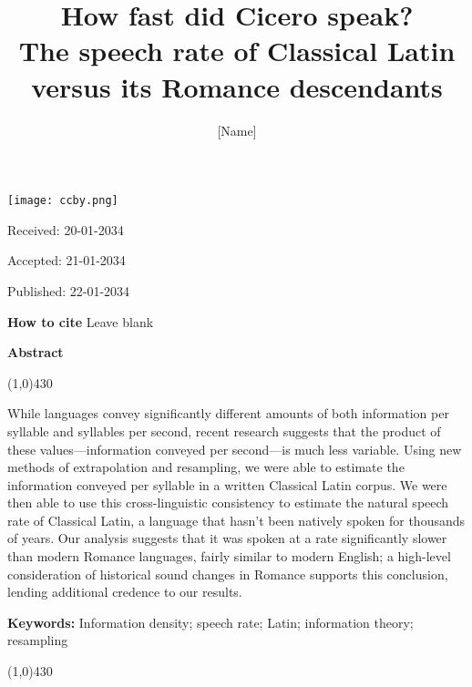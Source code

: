 \documentclass[12pt,twoside]{article}
\title{{\Huge{}How fast did Cicero speak?}\\{\Large{}The speech rate of Classical Latin versus its Romance descendants}}
\author{[Name]}
\affil{[Affiliation]\\[Email]}
\date{}
\makeatletter
\def\maketitle{{%
		\renewenvironment{tabular}[2][]
		{\begin{flushleft}}
			{\end{flushleft}}
		\AB@maketitle}}
\makeatother
\begin{document}
\maketitle

\thispagestyle{first}

\vspace{0.5cm}
\noindent \texttt{[image: ccby.png]}

\hfill Received: 20-01-2034 

\hfill Accepted: 21-01-2034

\hfill Published: 22-01-2034

\vspace{1cm}

\noindent \textbf{How to cite} Leave blank

\vspace{1.5cm}

\noindent \textbf{Abstract}
\begin{center}
 	\line(1,0){430}
\end{center}
\vspace{-0,3cm}
\noindent While languages convey significantly different amounts of both information per syllable and syllables per second, recent research suggests that the product of these values---information conveyed per second---is much less variable. Using new methods of extrapolation and resampling, we were able to estimate the information conveyed per syllable in a written Classical Latin corpus. We were then able to use this cross-linguistic consistency to estimate the natural speech rate of Classical Latin, a language that hasn't been natively spoken for thousands of years. Our analysis suggests that it was spoken at a rate significantly slower than modern Romance languages, fairly similar to modern English; a high-level consideration of historical sound changes in Romance supports this conclusion, lending additional credence to our results.

\vspace{5mm}

\noindent \textbf{Keywords:} Information density; speech rate; Latin; information theory; resampling

\vspace{4mm}
\begin{center}
	\line(1,0){430}
\end{center}

\end{document}
